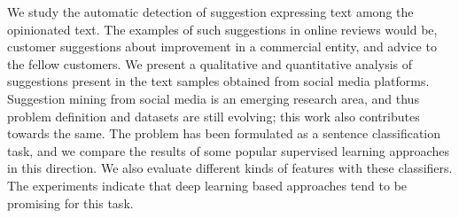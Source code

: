 We study the automatic detection of suggestion expressing text among the opinionated text. The examples of such suggestions in online reviews would be, customer suggestions about improvement in a commercial entity, and advice to the fellow customers. We present a qualitative and quantitative analysis of suggestions present in the text samples obtained from social media platforms. Suggestion mining from social media is an emerging research area, and thus problem definition and datasets are still evolving; this work also contributes towards the same. The problem has been formulated as a sentence classification task, and we compare the results of some popular supervised learning approaches in this direction. We also evaluate different kinds of features with these classifiers. The experiments indicate that deep learning based approaches tend to be promising for this task.
